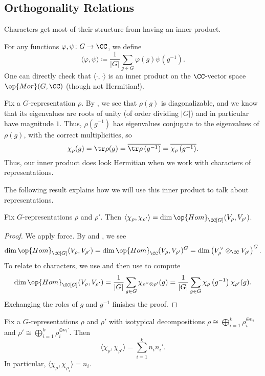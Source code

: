 \documentclass{article}
\begin{document}
\subsection{Orthogonality Relations}
Characters get most of their structure from having an inner product.
\begin{notation}
	For any functions $\varphi,\psi\colon G\to\CC$, we define
	\[\langle\varphi,\psi\rangle\coloneqq\frac1{|G|}\sum_{g\in G}\varphi(g)\psi\left(g^{-1}\right).\]
	One can directly check that $\langle\cdot,\cdot\rangle$ is an inner product on the $\CC$-vector space $\op{Mor}(G,\CC)$ (though not Hermitian!).
\end{notation}
\begin{remark} \label{rem:conj-char}
	Fix a $G$-representation $\rho$. By , we see that $\rho(g)$ is diagonalizable, and we know that its eigenvalues are roots of unity (of order dividing $|G|$) and in particular have magnitude $1$. Thus, $\rho\left(g^{-1}\right)$ has eigenvalues conjugate to the eigenvalues of $\rho(g)$, with the correct multiplicities, so
	\[\chi_\rho(g)=\tr\rho(g)=\overline{\tr\rho\left(g^{-1}\right)}=\overline{\chi_\rho\left(g^{-1}\right)}.\]
	Thus, our inner product does look Hermitian when we work with characters of representations.
\end{remark}
The following result explains how we will use this inner product to talk about representations.
\begin{theorem} \label{thm:ortho-relations}
	Fix $G$-representations $\rho$ and $\rho'$. Then $\langle\chi_\rho,\chi_{\rho'}\rangle=\dim\op{Hom}_{\CC[G]}(V_\rho,V_{\rho'})$.
\end{theorem}
\begin{proof}
	We apply force. By  and , we see
	\[\dim\op{Hom}_{\CC[G]}(V_\rho,V_{\rho'})=\dim\op{Hom}_\CC(V_\rho,V_{\rho'})^G=\dim\left(V_\rho^\lor\otimes_\CC V_{\rho'}\right)^G.\]
	To relate to characters, we use  and then use  to compute
	\[\dim\op{Hom}_{\CC[G]}(V_\rho,V_{\rho'})=\frac1{|G|}\sum_{g\in G}\chi_{\rho^\lor\otimes\rho'}(g)=\frac1{|G|}\sum_{g\in G}\chi_{\rho}\left(g^{-1}\right)\chi_{\rho'}(g).\]
	Exchanging the roles of $g$ and $g^{-1}$ finishes the proof.
\end{proof}
\begin{corollary} \label{cor:inner-product-isotypical}
	Fix a $G$-representations $\rho$ and $\rho'$ with isotypical decompositions $\rho\cong\bigoplus_{i=1}^k\rho_i^{\oplus n_i}$ and $\rho'\cong\bigoplus_{i=1}^k\rho_i^{\oplus n_i'}$. Then
	\[\langle\chi_\rho,\chi_{\rho'}\rangle=\sum_{i=1}^kn_in_i'.\]
	In particular, $\langle\chi_\rho,\chi_{\rho_i}\rangle=n_i$.
\end{corollary}
\end{document}
